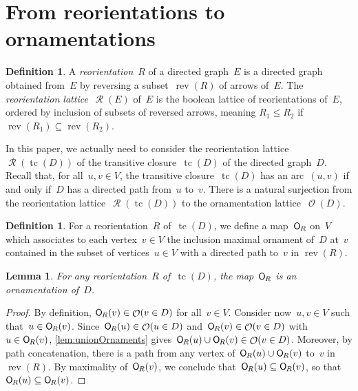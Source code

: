 \documentclass{amsart}
\newtheorem{lemma}[theorem]{Lemma}
\theoremstyle{definition}
\newtheorem{definition}[theorem]{Definition}
\renewcommand{\c}[1]{\mathcal{#1}} %
\DeclareMathOperator{\tc}{tc} %
\newcommand{\darkblue}{\color{darkblue}} %
\newcommand{\defn}[1]{\textsl{\darkblue #1}} %
\newcommand{\mymap}[2]{\mathsf{#1}_{\hspace{-.7pt}#2}}
\DeclareMathOperator{\Orn}{\c{O}}  %
\newcommand{\orn}[1]{\mymap{O}{#1}}  %
\DeclareMathOperator{\Reori}{\c{R}}  %
\DeclareMathOperator{\rev}{rev} %
\begin{document}

\section{From reorientations to ornamentations}
\label{sec:reorientations}

\begin{definition}
A \defn{reorientation}~$R$ of a directed graph~$E$ is a directed graph obtained from~$E$ by reversing a subset~$\rev(R)$ of arrows of~$E$.
The \defn{reorientation lattice}~$\Reori(E)$ of~$E$ is the boolean lattice of reorientations of~$E$, ordered by inclusion of subsets of reversed arrows, meaning $R_1 \le R_2$ if ${\rev(R_1) \subseteq \rev(R_2)}$.
\end{definition}

In this paper, we actually need to consider the reorientation lattice~$\Reori(\tc(D))$ of the transitive closure~$\tc(D)$ of the directed graph~$D$.
Recall that, for all~$u,v \in V$, the transitive closure~$\tc(D)$ has an arc~$(u,v)$ if and only if~$D$ has a directed path from~$u$ to~$v$.
There is a natural surjection from the reorientation lattice~$\Reori(\tc(D))$ to the ornamentation lattice~$\Orn(D)$.

\begin{definition}
\label{def:Reori2Orn}
For a reorientation~$R$ of~$\tc(D)$, we define a map~$\orn{R}$ on~$V$ which associates to each vertex~$v \in V$ the inclusion maximal ornament of~$D$ at~$v$ contained in the subset of vertices~$u \in V$ with a directed path to~$v$ in $\rev(R)$.
\end{definition}

\begin{lemma}
\label{lem:Reori2Orn1}
For any reorientation~$R$ of~$\tc(D)$, the map~$\orn{R}$ is an ornamentation of~$D$.
\end{lemma}

\begin{proof}
By definition, $\orn{R}(v) \in \Orn(v \in D)$ for all~$v \in V$.
Consider now~$u,v \in V$ such that~$u \in \orn{R}(v)$.
Since~$\orn{R}(u) \in \Orn(u \in D)$ and~$\orn{R}(v) \in \Orn(v \in D)$ with~${u \in \orn{R}(v)}$, \cref{lem:unionOrnaments} gives~$\orn{R}(u) \cup \orn{R}(v) \in \Orn(v \in D)$.
Moreover, by path concatenation, there is a path from any vertex of~$\orn{R}(u) \cup \orn{R}(v)$ to~$v$ in~$\rev(R)$.
By maximality of~$\orn{R}(v)$, we conclude that~$\orn{R}(u) \subseteq \orn{R}(v)$, so that~$\orn{R}(u) \subseteq \orn{R}(v)$.
\end{proof}
\end{document}
